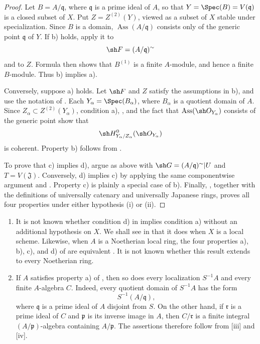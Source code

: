 \begin{proof}
Let $B=A/\mathfrak q$, where $\mathfrak q$ is a prime ideal of
$A$, so that $Y=\Spec(B)=V(\mathfrak q)$ is a closed subset of
$X$.  Put $Z=Z^{(2)}(Y)$, viewed as a subset of $X$ stable under
specialization.  Since $B$ is a domain,
$\operatorname{Ass}(A/\mathfrak q)$ consists only of the generic
point $\mathfrak q$ of $Y$.  If {\rm b)} holds, apply it to
\[
  \sh F=(A/\mathfrak q)^{\sim}
\]
and to $Z$.  Formula  then shows that $B^{(1)}$
is a finite $A$-module, and hence a finite $B$-module.  Thus
{\rm b)} implies {\rm a)}.

Conversely, suppose {\rm a)} holds.  Let $\sh F$ and $Z$ satisfy
the assumptions in {\rm b)}, and use the notation of
.  Each
$Y_\alpha=\Spec(B_\alpha)$, where $B_\alpha$ is a quotient
domain of $A$.  Since
$Z_\alpha\subset Z^{(2)}(Y_\alpha)$, condition {\rm a)},
, and the fact that
$\operatorname{Ass}(\sh O_{Y_\alpha})$ consists of the generic
point show that
\[
  \sh H^0_{Y_\alpha/Z_\alpha}(\sh O_{Y_\alpha})
\]
is coherent.  Property {\rm b)} follows from
.


To prove that {\rm c)} implies {\rm d)}, argue as above with
$\sh G=(A/\mathfrak q)^{\sim}|U$ and $T=V(\mathfrak J)$.
Conversely, {\rm d)} implies {\rm c)} by applying the same
componentwise argument and .  Property {\rm c)}
is plainly a special case of {\rm b)}.  Finally,
, together with the definitions of universally
catenary and universally Japanese rings, proves all four
properties under either hypothesis {\rm(i)} or {\rm(ii)}.
\end{proof}

\begin{remarks}[5.11.7]
\label{IV.5.11.7}
\begin{enumerate}[{\rm(i)}]
  \item It is not known whether condition {\rm d)} in
   implies condition {\rm a)} without an
  additional hypothesis on $X$.  We shall see in
   that it does when $X$ is a local scheme.
  Likewise, when $A$ is a Noetherian local ring, the four
  properties {\rm a)}, {\rm b)}, {\rm c)}, and {\rm d)} of
   are equivalent .  It is not
  known whether this result extends to every Noetherian ring.

  \item If $A$ satisfies property {\rm a)} of
  , then so does every localization $S^{-1}A$
  and every finite $A$-algebra $C$.  Indeed, every quotient
  domain of $S^{-1}A$ has the form
  \[
    S^{-1}(A/\mathfrak q),
  \]
  where $\mathfrak q$ is a prime ideal of $A$ disjoint from
  $S$.  On the other hand, if $\mathfrak r$ is a prime ideal of
  $C$ and $\mathfrak p$ is its inverse image in $A$, then
  $C/\mathfrak r$ is a finite integral
  $(A/\mathfrak p)$-algebra containing $A/\mathfrak p$.  The
  assertions therefore follow from [iii] and
  [iv].
\end{enumerate}
\end{remarks}
